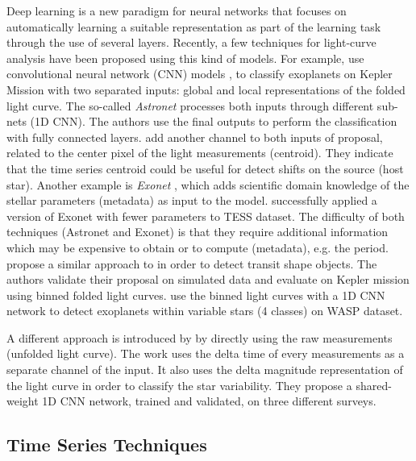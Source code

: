 Deep learning is a new paradigm for neural networks that focuses on automatically learning a suitable representation as part of the learning task through the use of several layers. Recently, a few techniques for light-curve analysis have been proposed using this kind of models. For example, \citet{shallue2018identifying} use convolutional neural network (CNN) models \citep{krizhevsky2012imagenet}, to classify exoplanets on Kepler Mission with two separated inputs: global and local representations of the folded light curve. The so-called \textit{Astronet} \citep{shallue2018identifying} processes both inputs through different sub-nets (1D CNN). The authors use the final outputs to perform the classification with fully connected layers. \citet{ansdell2018scientific} add another channel to both inputs of \citet{shallue2018identifying} proposal, related to the center pixel of the light measurements (centroid). They indicate that the time series centroid could be useful for detect shifts on the source (host star). Another example is \textit{Exonet} \citep{ansdell2018scientific}, which adds scientific domain knowledge of the stellar parameters (metadata) as input to the model.
\citet{osborn2020rapid} successfully applied a version of Exonet with fewer parameters to TESS dataset. %
The difficulty of both techniques (Astronet and Exonet) is that they require additional information which may be expensive to obtain or to compute (metadata), e.g. the period. %
\citet{pearson2018searching} propose a similar approach to \citet{shallue2018identifying} in order to detect transit shape objects. The authors validate their proposal on simulated data and evaluate on Kepler mission using binned folded light curves. \citet{schanche2019machine} use the binned light curves with a 1D CNN network to detect exoplanets within variable stars (4 classes) on WASP dataset.

A different approach is introduced by \citet{aguirre2019deep} by directly using the raw measurements (unfolded light curve). The work uses the delta time of every measurements as a separate channel of the input. It also uses the delta magnitude representation of the light curve in order to classify the star variability. They propose a shared-weight 1D CNN network, trained %
and validated, on three different surveys.

\subsection{Time Series Techniques}

